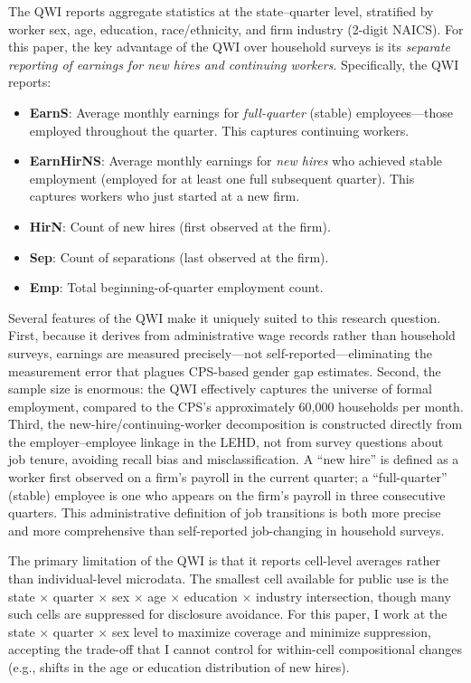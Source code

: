 \documentclass[12pt]{article}
\begin{document}
The QWI reports aggregate statistics at the state--quarter level, stratified by worker sex, age, education, race/ethnicity, and firm industry (2-digit NAICS). For this paper, the key advantage of the QWI over household surveys is its \textit{separate reporting of earnings for new hires and continuing workers}. Specifically, the QWI reports:

\begin{itemize}
  \item \textbf{EarnS}: Average monthly earnings for \textit{full-quarter} (stable) employees---those employed throughout the quarter. This captures continuing workers.
  \item \textbf{EarnHirNS}: Average monthly earnings for \textit{new hires} who achieved stable employment (employed for at least one full subsequent quarter). This captures workers who just started at a new firm.
  \item \textbf{HirN}: Count of new hires (first observed at the firm).
  \item \textbf{Sep}: Count of separations (last observed at the firm).
  \item \textbf{Emp}: Total beginning-of-quarter employment count.
\end{itemize}

Several features of the QWI make it uniquely suited to this research question. First, because it derives from administrative wage records rather than household surveys, earnings are measured precisely---not self-reported---eliminating the measurement error that plagues CPS-based gender gap estimates. Second, the sample size is enormous: the QWI effectively captures the universe of formal employment, compared to the CPS's approximately 60,000 households per month. Third, the new-hire/continuing-worker decomposition is constructed directly from the employer--employee linkage in the LEHD, not from survey questions about job tenure, avoiding recall bias and misclassification. A ``new hire'' is defined as a worker first observed on a firm's payroll in the current quarter; a ``full-quarter'' (stable) employee is one who appears on the firm's payroll in three consecutive quarters. This administrative definition of job transitions is both more precise and more comprehensive than self-reported job-changing in household surveys.

The primary limitation of the QWI is that it reports cell-level averages rather than individual-level microdata. The smallest cell available for public use is the state $\times$ quarter $\times$ sex $\times$ age $\times$ education $\times$ industry intersection, though many such cells are suppressed for disclosure avoidance. For this paper, I work at the state $\times$ quarter $\times$ sex level to maximize coverage and minimize suppression, accepting the trade-off that I cannot control for within-cell compositional changes (e.g., shifts in the age or education distribution of new hires).
\end{document}

